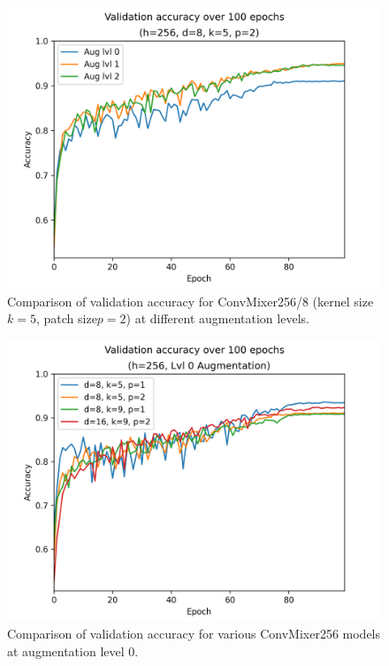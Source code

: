 \documentclass[letterpaper]{article} %
\begin{document}
  \begin{figure}
    \includegraphics[width=\linewidth]{val_k5p2.png}
    \caption{Comparison of validation accuracy for ConvMixer256/8 (kernel size $k=5$, patch size$p=2$) at different augmentation levels.}
  \end{figure}

  \begin{figure}
    \includegraphics[width=\linewidth]{val_lvl0.png}
    \caption{Comparison of validation accuracy for various ConvMixer256 models at augmentation level 0.}
  \end{figure}

\end{document}
